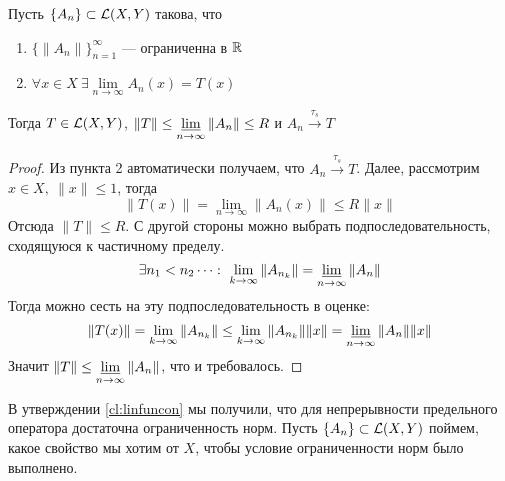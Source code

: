 {\footnotesize \color{violet}
\begin{claim}\label{cl:secofop}
	Пусть $\{A_n\} \subset \mathcal{L}(X, Y)$ такова, что
	\begin{enumerate}
		\item $\{\|A_n\|\}_{n=1}^\infty$ --- ограниченна в $\mathbb{R}$
		\item $\forall x \in X  \ \exists \lim\limits_{n \to \infty}A_n(x) = T(x)$
	\end{enumerate}
	Тогда $T \in \mathcal{L}(X,Y)$, $\|T\| \leq \varliminf\limits_{n \to \infty} \|A_n\| \leq R$ и $A_n \xrightarrow{\tau_s} T$
\end{claim}
\begin{proof}
	Из пункта 2 автоматически получаем, что $A_n \xrightarrow{\tau_s} T$. Далее, рассмотрим $x \in X, \ \|x\| \leq 1$, тогда
	$$
	\|T(x)\| = \lim\limits_{n \to \infty}\|A_n(x)\| \leq R\|x\|
	$$
	Отсюда $\|T\| \leq R$. С другой стороны можно выбрать подпоследовательность, сходящуюся к частичному пределу.
	$$
	\exists n_1 \mathrel{<} n_2 \dots : \ \lim\limits_{k \to \infty}\|A_{n_k}\| = \varliminf_{n \to \infty}\|A_n\|
	$$
	Тогда можно сесть на эту подпоследовательность в оценке: 
	$$
	\|T(x)\| = \lim\limits_{k \to \infty}\|A_{n_k}\| \leq \lim_{k \rightarrow \infty} \|A_{n_k}\|\|x\| = \varliminf_{n \rightarrow \infty} \|A_{n}\|\|x\|
	$$
	Значит $\|T\| \leq \varliminf\limits_{n \to \infty} \|A_n\|$, что и требовалось.
\end{proof}
}

В утверждении \ref{cl:linfuncon} мы получили, что для непрерывности предельного оператора достаточна ограниченность норм. Пусть $\{A_n\} \subset \mathcal{L}(X,Y)$ поймем, какое свойство мы хотим от $X$, чтобы условие ограниченности норм было выполнено. 

